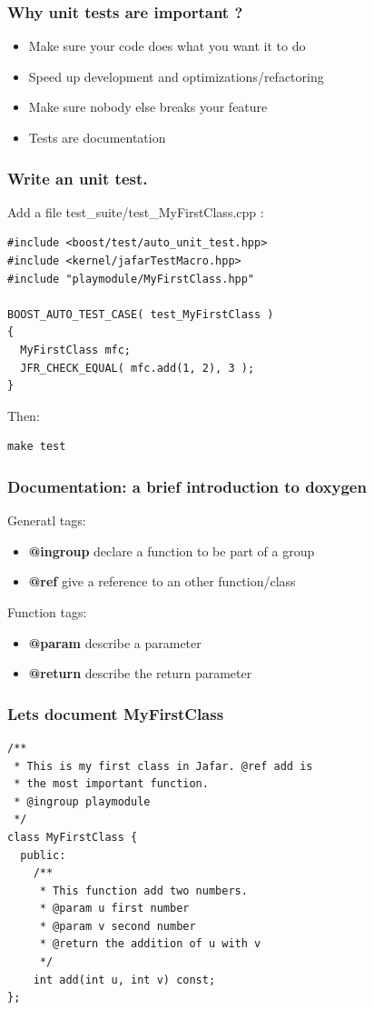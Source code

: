 \documentclass[compress]{beamer}
\begin{document}
\begin{frame}
  \frametitle{Why unit tests are important ?}
  \begin{itemize}
    \item<1-> Make sure your code does what you want it to do
    \item<2-> Speed up development and optimizations/refactoring
    \item<3-> Make sure nobody else breaks your feature
    \item<4-> Tests are documentation
  \end{itemize}

\end{frame}

\begin{frame}[fragile]
  \frametitle{Write an unit test.}
  Add a file test\_suite/test\_MyFirstClass.cpp :
  \begin{lstlisting}
#include <boost/test/auto_unit_test.hpp>
#include <kernel/jafarTestMacro.hpp>
#include "playmodule/MyFirstClass.hpp"

BOOST_AUTO_TEST_CASE( test_MyFirstClass )
{
  MyFirstClass mfc;
  JFR_CHECK_EQUAL( mfc.add(1, 2), 3 );
}
  \end{lstlisting}
  Then:
  \begin{lstlisting}
make test
  \end{lstlisting}
  
\end{frame}

\begin{frame}
  \frametitle{Documentation: a brief introduction to doxygen}
  Generatl tags:
  \begin{itemize}
    \item \textbf{@ingroup} declare a function to be part of a group
    \item \textbf{@ref} give a reference to an other function/class
  \end{itemize}

  Function tags:
  \begin{itemize}
    \item \textbf{@param} describe a parameter
    \item \textbf{@return} describe the return parameter
  \end{itemize}

\end{frame}

\begin{frame}[fragile]
  \frametitle{Lets document MyFirstClass}
  \begin{lstlisting}
/**
 * This is my first class in Jafar. @ref add is
 * the most important function.
 * @ingroup playmodule
 */
class MyFirstClass {
  public:
    /**
     * This function add two numbers.
     * @param u first number
     * @param v second number
     * @return the addition of u with v
     */
    int add(int u, int v) const;
};
  \end{lstlisting}
\end{frame}
\end{document}
